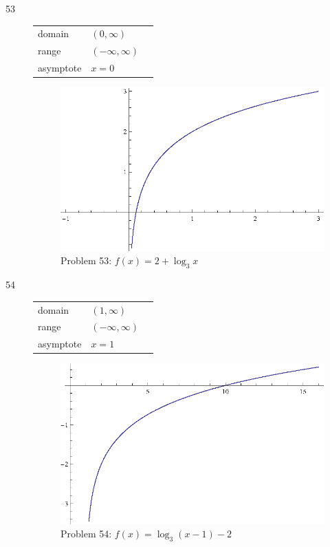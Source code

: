\documentclass{exam}
\begin{document}
\begin{description}
    \item[53]
      \begin{tabular}[h]{lll}
        \toprule
        domain    & $(0, \infty)$ \\
        range     & $(-\infty, \infty)$ \\
        asymptote & $x = 0$ \\
        \bottomrule
      \end{tabular}

      \begin{figure}[h]
        \centering
        \includegraphics[scale = 0.9]{problem53.eps}
        \caption{Problem 53: $f(x) = 2 + \log_3 x$}
      \end{figure}

    \item[54]
      \begin{tabular}[h]{lll}
        \toprule
        domain    & $(1, \infty)$ \\
        range     & $(-\infty, \infty)$ \\
        asymptote & $x = 1$ \\
        \bottomrule
      \end{tabular}

      \begin{figure}[h]
        \centering
        \includegraphics[scale = 0.9]{problem54.eps}
        \caption{Problem 54: $f(x) = \log_3(x - 1) - 2$}
      \end{figure}


\end{description}
\end{document}
